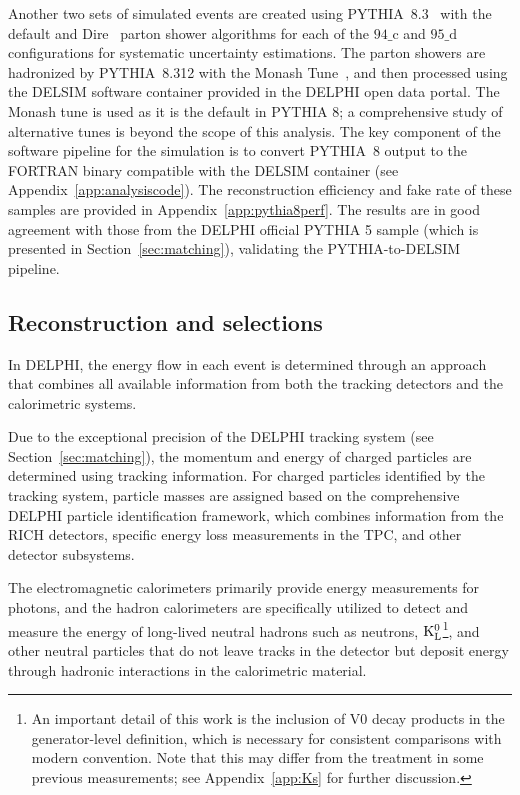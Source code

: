 \documentclass[a4paper,11pt]{article}
\begin{document}
Another two sets of simulated events are created using PYTHIA~8.3~\cite{Bierlich:2022pfr} with the default and Dire~\cite{Hoche:2015sya} parton shower algorithms for each of the $94\_\text{c}$ and $95\_\text{d}$ configurations for systematic uncertainty estimations. 
The parton showers are hadronized by PYTHIA~8.312 with the Monash Tune~\cite{Skands:2014pea}, and then processed using the DELSIM software container provided in the DELPHI open data portal. 
The Monash tune is used as it is the default in PYTHIA 8; a comprehensive study of alternative tunes is beyond the scope of this analysis.
The key component of the software pipeline for the simulation is to convert PYTHIA~8 output to the FORTRAN binary compatible with the DELSIM container (see Appendix~\ref{app:analysiscode}). 
The reconstruction efficiency and fake rate of these samples are provided in Appendix~\ref{app:pythia8perf}. 
The results are in good agreement with those from the DELPHI official PYTHIA 5 sample (which is presented in Section~\ref{sec:matching}), validating the PYTHIA-to-DELSIM pipeline. 

\subsection{Reconstruction and selections}
\label{sec:selections}
In DELPHI, the energy flow in each event is determined through an approach that combines all available information from both the tracking detectors and the calorimetric systems. 

Due to the exceptional precision of the DELPHI tracking system (see Section~\ref{sec:matching}), the momentum and energy of charged particles are determined using tracking information. For charged particles identified by the tracking system, particle masses are assigned based on the comprehensive DELPHI particle identification framework, which combines information from the RICH detectors, specific energy loss measurements in the TPC, and other detector subsystems.

The electromagnetic calorimeters primarily provide energy measurements for photons, and the hadron calorimeters are specifically utilized to detect and measure the energy of long-lived neutral hadrons such as neutrons, $\rm K_L^0$\footnote{An important detail of this work is the inclusion of V0 decay products in the generator-level definition, which is necessary for consistent comparisons with modern convention. Note that this may differ from the treatment in some previous measurements; see Appendix~\ref{app:Ks} for further discussion.}, and other neutral particles that do not leave tracks in the detector but deposit energy through hadronic interactions in the calorimetric material.
\end{document}
